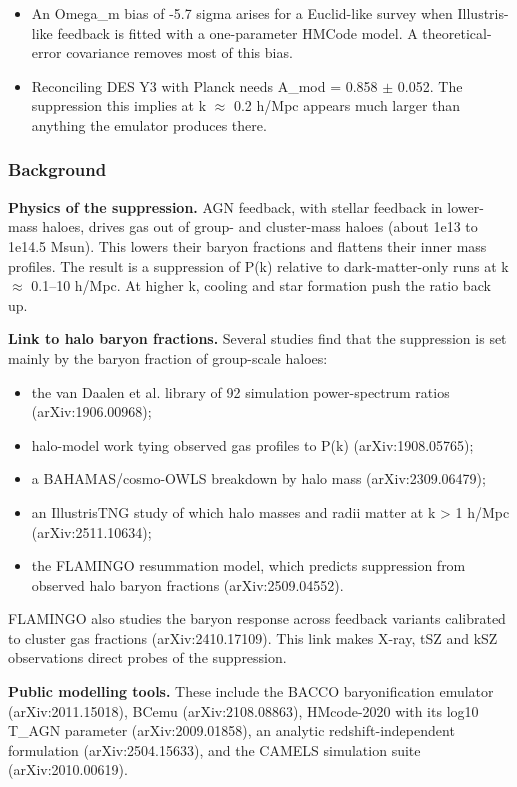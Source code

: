 \documentclass[11pt,a4paper]{article}
\begin{document}
\begin{itemize}
  \item An Omega\_m bias of -5.7 sigma arises for a Euclid-like survey when Illustris-like feedback is fitted with a one-parameter HMCode model. A theoretical-error covariance removes most of this bias.
  \item Reconciling DES Y3 with Planck needs A\_mod = 0.858 $\pm$ 0.052. The suppression this implies at k $\approx$ 0.2 h/Mpc appears much larger than anything the emulator produces there.
\end{itemize}
\subsubsection*{Background}
\textbf{Physics of the suppression.} AGN feedback, with stellar feedback in lower-mass haloes, drives gas out of group- and cluster-mass haloes (about 1e13 to 1e14.5 Msun). This lowers their baryon fractions and flattens their inner mass profiles. The result is a suppression of P(k) relative to dark-matter-only runs at k $\approx$ 0.1--10 h/Mpc. At higher k, cooling and star formation push the ratio back up.

\textbf{Link to halo baryon fractions.} Several studies find that the suppression is set mainly by the baryon fraction of group-scale haloes:

\begin{itemize}
  \item the van Daalen et al. library of 92 simulation power-spectrum ratios (arXiv:1906.00968);
  \item halo-model work tying observed gas profiles to P(k) (arXiv:1908.05765);
  \item a BAHAMAS/cosmo-OWLS breakdown by halo mass (arXiv:2309.06479);
  \item an IllustrisTNG study of which halo masses and radii matter at k \textgreater{} 1 h/Mpc (arXiv:2511.10634);
  \item the FLAMINGO resummation model, which predicts suppression from observed halo baryon fractions (arXiv:2509.04552).
\end{itemize}
FLAMINGO also studies the baryon response across feedback variants calibrated to cluster gas fractions (arXiv:2410.17109). This link makes X-ray, tSZ and kSZ observations direct probes of the suppression.

\textbf{Public modelling tools.} These include the BACCO baryonification emulator (arXiv:2011.15018), BCemu (arXiv:2108.08863), HMcode-2020 with its log10 T\_AGN parameter (arXiv:2009.01858), an analytic redshift-independent formulation (arXiv:2504.15633), and the CAMELS simulation suite (arXiv:2010.00619).
\end{document}
